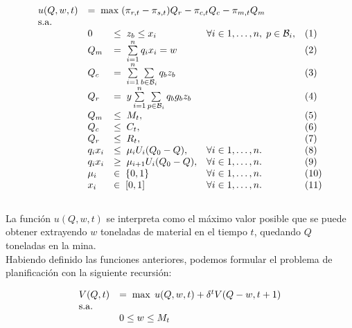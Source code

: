 \documentclass[12pt,letterpaper]{article}
\newcommand\mB{\mathcal{B}}
\begin{document}
\[
\begin{array}{lllll}
u(Q,w,t) &  \multicolumn{4}{l}{ = \; \max \; (\pi_{r,t} - \pi_{s,t} ) Q_{r}  - \pi_{c,t} Q_{c} - \pi_{m,t} Q_{m} } \\
\text{s.a.} & & & & \\
& 0   & \leq \; z_{b} \leq x_{i} & \forall i \in 1, \ldots, n, \; p \in \mB_i, & (1)\\
& Q_{m} & = \; \sum\limits_{i = 1}^n q_i x_i = w & & (2)\\
& Q_{c} & = \; \sum\limits_{i = 1}^n \sum\limits_{b \in \mB_i} q_{b} z_{b} & & (3)\\
& Q_{r} & = \; y \sum\limits_{i = 1}^n \sum\limits_{p \in \mB_i} q_{b} g_{b} z_{b} &  & (4)\\
& Q_{m} & \leq \; M_t, & & (5)\\
& Q_{c} & \leq \; C_t, & & (6)\\
& Q_{r} & \leq \; R_t, & & (7) \\
& q_i x_{i} & \leq \; \mu_i U_i(Q_0-Q) , & \forall i \in 1, \ldots, n. & (8) \\
& q_i x_{i} & \geq \; \mu_{i+1} U_i(Q_0-Q) , & \forall i \in 1, \ldots, n. & (9) \\
& \mu_{i} & \in \; \{0,1\} & \forall i \in 1, \ldots, n.  & (10) \\
&      x_{i} & \in \; [0,1] & \forall i \in 1, \ldots, n.  & (11) \\
\end{array}
\]
\\
La función $u(Q,w,t)$ se interpreta como el máximo valor posible que se puede obtener extrayendo $w$ toneladas de material en el tiempo $t$, quedando $Q$ toneladas en la mina.\\

Habiendo definido las funciones anteriores, podemos formular el problema de planificación con la siguiente recursión:

\[
\begin{array}{lllll}
V(Q,t) &  \multicolumn{4}{l}{ = \; \max \; u(Q,w,t) + \delta^t V(Q-w,t+1) } \\
\text{s.a.} & & & & \\
& 0  \leq w \leq M_t \\
\end{array}
\]
\\
\end{document}
